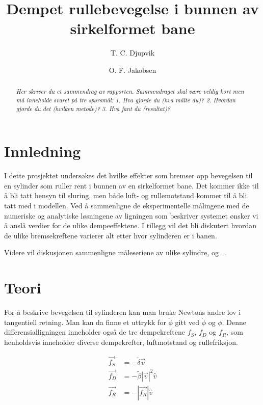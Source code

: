 \documentclass[5p]{elsarticle}
\title{Dempet rullebevegelse i bunnen av sirkelformet bane}
\author[fysikk]{T. C. Djupvik}
\author[fysikk]{O. F. Jakobsen}
\begin{document}
\begin{abstract}

\textit{Her skriver du et sammendrag av rapporten. Sammendraget skal være veldig kort
men må inneholde svaret på tre spørsmål: 1. Hva gjorde du (hva målte du)? 2. Hvordan 
gjorde du det (hvilken metode)? 3. Hva fant du (resultat)?}
\end{abstract}

\maketitle %

\section{Innledning}
I dette prosjektet undersøkes det hvilke effekter som bremser opp bevegelsen 
til en sylinder som ruller rent i bunnen av en sirkelformet bane. Det kommer ikke til å 
bli tatt hensyn til sluring, men både luft- og rullemotstand kommer til å bli tatt med i modellen.
Ved å sammenligne de eksperimentelle målingene med de numeriske og analytiske løsningene av 
ligningen som beskriver systemet ønsker vi å anslå verdier for de ulike dempeeffektene. 
I tillegg vil det bli diskutert hvordan de ulike bremsekreftene varierer alt etter hvor sylinderen 
er i banen.
\par
Videre vil diskusjonen sammenligne måleseriene av ulike sylindre, og ...

\section{Teori}

For å beskrive bevegelsen til sylinderen kan man bruke Newtons andre lov i tangentiell retning.
Man kan da finne et uttrykk for \(\ddot{\phi}\) gitt ved \(\dot{\phi}\) og \(\phi\). 
Denne differensialligningen inneholder også de tre dempekreftene \(f_S\), \(f_D\) og \(f_R\), 
som henholdsvis inneholder diverse dempekrefter, luftmotstand og rullefriksjon.

\begin{align}
	\vec{f_S} & = -\tilde{\delta} \vec{v} 			\\
	\vec{f_D} & = -\tilde{\beta}|\vec{v}|^2\hat{v}  \\
	\vec{f_R} & = -|\vec{f_R}|\hat{v}				
\end{align}
\end{document}

